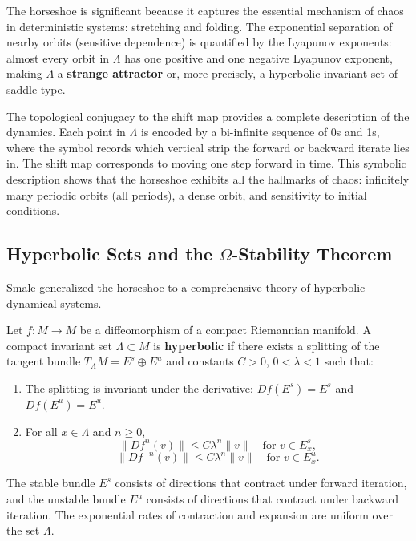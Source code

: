 The horseshoe is significant because it captures the essential mechanism of chaos in deterministic systems: stretching and folding. The exponential separation of nearby orbits (sensitive dependence) is quantified by the Lyapunov exponents: almost every orbit in \(\Lambda\) has one positive and one negative Lyapunov exponent, making \(\Lambda\) a \textbf{strange attractor} or, more precisely, a hyperbolic invariant set of saddle type.

The topological conjugacy to the shift map provides a complete description of the dynamics. Each point in \(\Lambda\) is encoded by a bi-infinite sequence of 0s and 1s, where the symbol records which vertical strip the forward or backward iterate lies in. The shift map corresponds to moving one step forward in time. This symbolic description shows that the horseshoe exhibits all the hallmarks of chaos: infinitely many periodic orbits (all periods), a dense orbit, and sensitivity to initial conditions.

\subsection{Hyperbolic Sets and the \texorpdfstring{\(\Omega\)}{Omega}-Stability Theorem}

Smale generalized the horseshoe to a comprehensive theory of hyperbolic dynamical systems.

\begin{definition}
Let \(f: M \to M\) be a diffeomorphism of a compact Riemannian manifold. A compact invariant set \(\Lambda \subset M\) is \textbf{hyperbolic} if there exists a splitting of the tangent bundle \(T_\Lambda M = E^s \oplus E^u\) and constants \(C > 0\), \(0 < \lambda < 1\) such that:
\begin{enumerate}
    \item The splitting is invariant under the derivative: \(Df(E^s) = E^s\) and \(Df(E^u) = E^u\).
    \item For all \(x \in \Lambda\) and \(n \geq 0\),
    \[
    \|Df^n(v)\| \leq C \lambda^n \|v\| \quad \text{for } v \in E^s_x,
    \]
    \[
    \|Df^{-n}(v)\| \leq C \lambda^n \|v\| \quad \text{for } v \in E^u_x.
    \]
    \end{enumerate}
\end{definition}

The stable bundle \(E^s\) consists of directions that contract under forward iteration, and the unstable bundle \(E^u\) consists of directions that contract under backward iteration. The exponential rates of contraction and expansion are uniform over the set \(\Lambda\).


